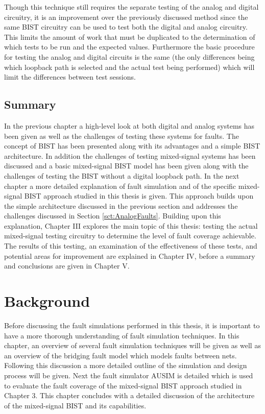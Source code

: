 \documentclass[12pt]{report}
\begin{document}
Though this technique still requires the separate testing of the analog and digital circuitry, it is an improvement over the previously discussed method since the same BIST circuitry can be used to test both the digital and analog circuitry\cite{stroud}.  This limits the amount of work that must be duplicated to the determination of which tests to be run and the expected values.  Furthermore the basic procedure for testing the analog and digital circuits is the same (the only differences being which loopback path is selected and the actual test being performed) which will limit the differences between test sessions.

\section{Summary}
In the previous chapter a high-level look at both digital and analog systems has been given as well as the challenges of testing these systems for faults.  The concept of BIST has been presented along with its advantages and a simple BIST architecture.  In addition the challenges of testing mixed-signal systems has been discussed and a basic mixed-signal BIST model has been given along with the challenges of testing the BIST without a digital loopback path.  In the next chapter a more detailed explanation of fault simulation and of the specific mixed-signal BIST approach studied in this thesis is given.  This approach builds upon the simple architecture discussed in the previous section and addresses the challenges discussed in Section \ref{sct:AnalogFaults}.  Building upon this explanation, Chapter III explores the main topic of this thesis: testing the actual mixed-signal testing circuitry to determine the level of fault coverage achievable.  The results of this testing, an examination of the effectiveness of these tests, and potential areas for improvement are explained in Chapter IV, before a summary and conclusions are given in Chapter V.

\chapter{Background}
Before discussing the fault simulations performed in this thesis, it is important to have a more thorough understanding of fault simulation techniques.  In this chapter, an overview of several fault simulation techniques will be given as well as an overview of the bridging fault model which models faults between nets.  Following this discussion a more detailed outline of the simulation and design process will be given.  Next the fault simulator AUSIM is detailed which is used to evaluate the fault coverage of the mixed-signal BIST approach studied in Chapter 3.  This chapter concludes with a detailed discussion of the architecture of the mixed-signal BIST and its capabilities.
\end{document}
